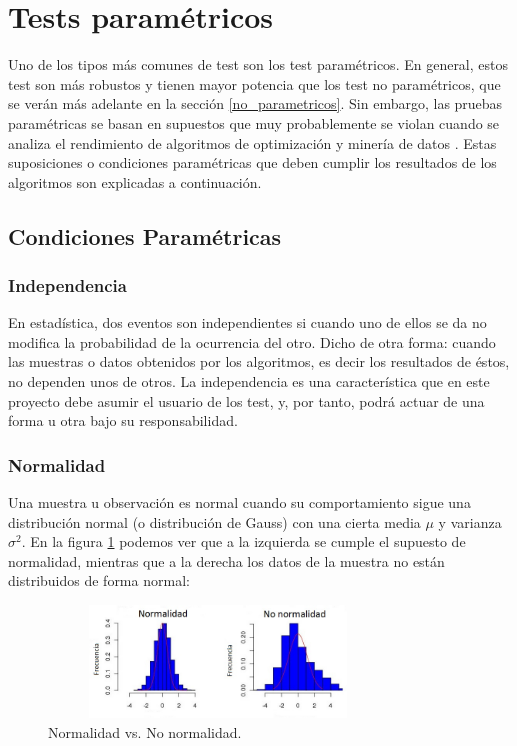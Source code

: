 
\section{Tests paramétricos} \label{parametricos}
Uno de los tipos más comunes de test son los test paramétricos. En general, estos test son más robustos y
tienen mayor potencia que los test no paramétricos, que se verán más adelante en la sección \ref{no_parametricos}.
Sin embargo, las pruebas paramétricas se basan en supuestos que muy probablemente se violan cuando se analiza el
rendimiento de algoritmos de optimización y minería de datos \cite{parametricos}. Estas suposiciones
o condiciones paramétricas que deben cumplir los resultados de los algoritmos son explicadas a continuación.


\subsection{Condiciones Paramétricas} \label{condiciones}

\subsubsection{Independencia}
En estadística, dos eventos son independientes si cuando uno de ellos se da no modifica la probabilidad de la
ocurrencia del otro. Dicho de otra forma: cuando las muestras o datos obtenidos por los algoritmos, es decir los
resultados de éstos, no dependen unos de otros. La independencia es una característica que en este proyecto debe
asumir el usuario de los test, y, por tanto, podrá actuar de una forma u otra bajo su responsabilidad.

\subsubsection{Normalidad}
Una muestra u observación es normal cuando su comportamiento sigue una distribución normal (o distribución de
Gauss) con una cierta media $\mu$ y varianza $\sigma^2$. En la figura \ref{fig:normalidad} podemos ver que a la
izquierda se cumple el supuesto de normalidad, mientras que a la derecha los datos de la muestra no están distribuidos
de forma normal:

\begin{figure}[h]
\centering
\includegraphics[width=9cm,height=3cm]{figuras/normalidad.jpg}
\caption{Normalidad vs. No normalidad.}
\label{fig:normalidad}
\end{figure}

